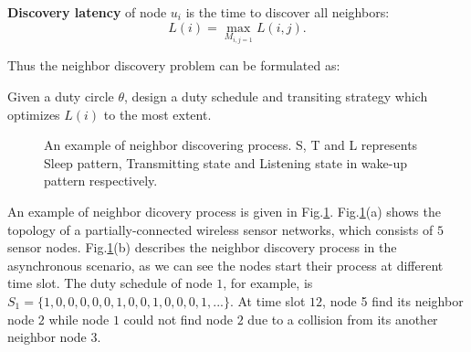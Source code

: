 \begin{definition}
\textbf{Discovery latency} of node $u_i$ is the time to discover all neighbors:
$$L(i) = \max_{M_{i,j = 1}} L (i,j).
$$
\end{definition}

Thus the neighbor discovery problem can be formulated as:
\begin{problem}
Given a duty circle $\theta$, design a duty schedule and transiting strategy which optimizes $L(i)$ to the most extent. 
\end{problem}

\begin{figure}[!t]
\centering
{}
\vspace{0.03in}
\caption{An example of neighbor discovering process. S, T and L represents Sleep pattern, 
Transmitting state and Listening state in wake-up pattern respectively.}
\label{NDexample}
\end{figure}

An example of neighbor dicovery process is given in Fig.\ref{NDexample}. 
Fig.\ref{NDexample}(a) shows the topology of a partially-connected 
wireless sensor networks, which consists of $5$ sensor nodes. 
Fig.\ref{NDexample}(b) describes the neighbor discovery process 
in the asynchronous scenario, as we can see the nodes 
start their process at different time slot. The duty schedule of 
node $1$, for example, is $S_1=\{1,0,0,0,0,0,1,0,0,1,0,0,0,1,...\}$.  
At time slot $12$, node 5 find its neighbor node $2$ while node $1$ 
could not find node $2$ due to a collision from its another neighbor node $3$. 



